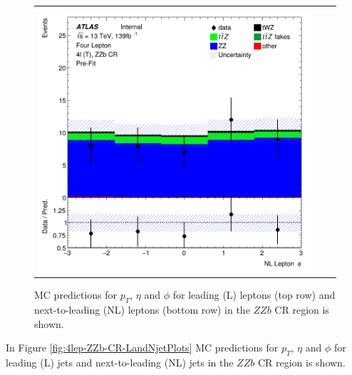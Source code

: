 \begin{figure}[htbp]
\begin{tabular}{ccc}
    \includegraphics[width=.3\textwidth]{figures/PreFitPlots/lep4_ZZb_4T_NL_lepton_phi.png} \\

  \end{tabular}
    \caption{MC predictions for $p_{T}$, $\eta$ and $\phi$ for leading (L) leptons (top row) and next-to-leading (NL) leptons (bottom row) in the $ZZb$ CR region  is shown.}
  \label{fig:4lep-ZZb-CR-leptonPlots}
\end{figure}

In Figure \ref{fig:4lep-ZZb-CR-LandNjetPlots} MC predictions for $p_{T}$, $\eta$ and $\phi$ for leading (L) jets and next-to-leading (NL) jets in the $ZZb$ CR region is shown.

